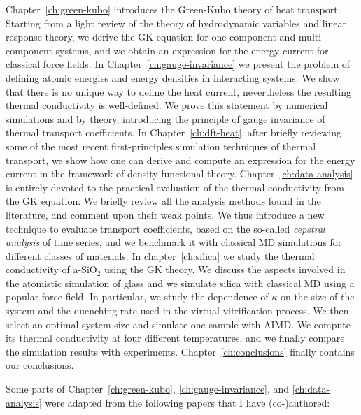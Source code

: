 Chapter~\ref{ch:green-kubo} introduces the Green-Kubo theory of heat transport. 
Starting from a light review of the theory of hydrodynamic variables and linear response theory, we derive the GK equation for one-component and multi-component systems, and we obtain an expression for the energy current for classical force fields. 
In Chapter~\ref{ch:gauge-invariance} we present the problem of defining atomic energies and energy densities in interacting systems. We show that there is no unique way to define the heat current, nevertheless the resulting thermal conductivity is well-defined. We prove this statement by numerical simulations and by theory, introducing the principle of gauge invariance of thermal transport coefficients. 
In Chapter~\ref{ch:dft-heat}, after briefly reviewing some of the most recent first-principles simulation techniques of thermal transport, we show how one can derive and compute an \abinitio expression for the energy current in the framework of density functional theory. 
Chapter~\ref{ch:data-analysis} is entirely devoted to the practical evaluation of the thermal conductivity from the GK equation. We briefly review all the analysis methods found in the literature, and comment upon their weak points. 
We thus introduce a new technique to evaluate transport coefficients, based on the so-called \emph{cepstral analysis} of time series, and we benchmark it with classical MD simulations for different classes of materials.
In chapter~\ref{ch:silica} we study the thermal conductivity of a-SiO$_2$ using the \abinitio GK theory. 
We discuss the aspects involved in the atomistic simulation of glass and we simulate silica with classical MD using a popular force field. In particular, we study the dependence of $\kappa$ on the size of the system and the quenching rate used in the virtual vitrification process. 
We then select an optimal system size and simulate one sample with AIMD. 
We compute its thermal conductivity at four different temperatures, and we finally compare the simulation results with experiments. 
Chapter~\ref{ch:conclusions} finally contains our conclusions.

\smallskip
Some parts of Chapter~\ref{ch:green-kubo}, \ref{ch:gauge-invariance}, and \ref{ch:data-analysis} were adapted from the following papers that I have (co-)authored:







